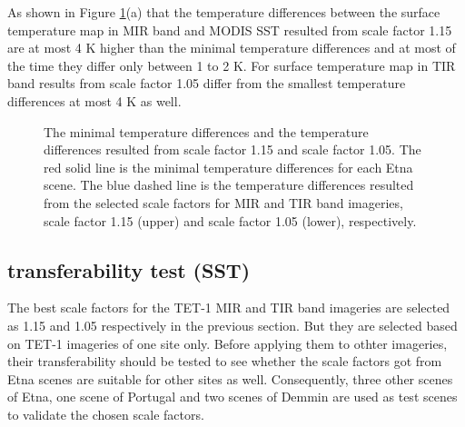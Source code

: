 \noindent As shown in Figure \ref{fig:etna_bsc&temComp}(a) that the temperature differences between the surface temperature map in MIR band and MODIS SST resulted from scale factor 1.15 are at most 4 K higher than the minimal temperature differences and at most of the time they differ only between 1 to 2 K. For surface temperature map in TIR band results from scale factor 1.05 differ from the smallest temperature differences at most 4 K as well.\\

\begin{figure}[!htbp]
\centering
{}
\hspace{0.5in}
\caption{The minimal temperature differences and the temperature differences resulted from scale factor 1.15 and scale factor 1.05. The red solid line is the minimal temperature differences for each Etna scene. The blue dashed line is the temperature differences resulted from the selected scale factors for MIR and TIR band imageries, scale factor 1.15 (upper) and scale factor 1.05 (lower), respectively.}
\label{fig:etna_bsc&temComp}
\end{figure}



\subsection{transferability test (SST)}
The best scale factors for the TET-1 MIR and TIR band imageries are selected as 1.15 and 1.05 respectively in the previous section. But they are selected based on TET-1 imageries of one site only. Before applying them to othter imageries, their transferability should be tested to see whether the scale factors got from Etna scenes are suitable for other sites as well. Consequently, three other scenes of Etna, one scene of Portugal and two scenes of Demmin are used as test scenes to validate the chosen scale factors.\\

